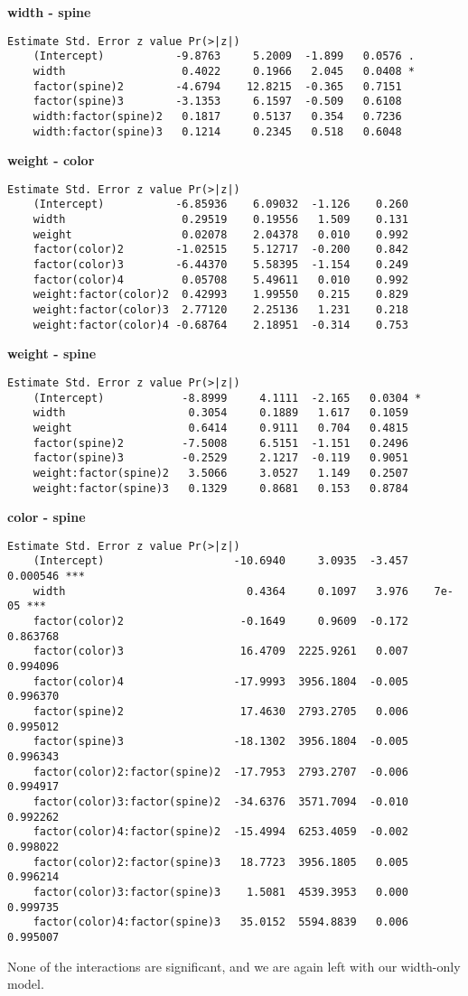 \documentclass[a4paper, twocolumn]{article}
\begin{document}
\textbf{width - spine}
\begin{Verbatim}[fontsize=\scriptsize]
    Estimate Std. Error z value Pr(>|z|)
    (Intercept)           -9.8763     5.2009  -1.899   0.0576 .
    width                  0.4022     0.1966   2.045   0.0408 *
    factor(spine)2        -4.6794    12.8215  -0.365   0.7151  
    factor(spine)3        -3.1353     6.1597  -0.509   0.6108  
    width:factor(spine)2   0.1817     0.5137   0.354   0.7236  
    width:factor(spine)3   0.1214     0.2345   0.518   0.6048    
\end{Verbatim}

\textbf{weight - color}
\begin{Verbatim}[fontsize=\scriptsize]
    Estimate Std. Error z value Pr(>|z|)
    (Intercept)           -6.85936    6.09032  -1.126    0.260
    width                  0.29519    0.19556   1.509    0.131
    weight                 0.02078    2.04378   0.010    0.992
    factor(color)2        -1.02515    5.12717  -0.200    0.842
    factor(color)3        -6.44370    5.58395  -1.154    0.249
    factor(color)4         0.05708    5.49611   0.010    0.992
    weight:factor(color)2  0.42993    1.99550   0.215    0.829
    weight:factor(color)3  2.77120    2.25136   1.231    0.218
    weight:factor(color)4 -0.68764    2.18951  -0.314    0.753    
\end{Verbatim}

\textbf{weight - spine}
\begin{Verbatim}[fontsize=\scriptsize]
    Estimate Std. Error z value Pr(>|z|)
    (Intercept)            -8.8999     4.1111  -2.165   0.0304 *
    width                   0.3054     0.1889   1.617   0.1059  
    weight                  0.6414     0.9111   0.704   0.4815  
    factor(spine)2         -7.5008     6.5151  -1.151   0.2496  
    factor(spine)3         -0.2529     2.1217  -0.119   0.9051  
    weight:factor(spine)2   3.5066     3.0527   1.149   0.2507  
    weight:factor(spine)3   0.1329     0.8681   0.153   0.8784 
\end{Verbatim}

\textbf{color - spine}
\begin{Verbatim}[fontsize=\scriptsize]
    Estimate Std. Error z value Pr(>|z|)    
    (Intercept)                    -10.6940     3.0935  -3.457 0.000546 ***
    width                            0.4364     0.1097   3.976    7e-05 ***
    factor(color)2                  -0.1649     0.9609  -0.172 0.863768    
    factor(color)3                  16.4709  2225.9261   0.007 0.994096    
    factor(color)4                 -17.9993  3956.1804  -0.005 0.996370    
    factor(spine)2                  17.4630  2793.2705   0.006 0.995012    
    factor(spine)3                 -18.1302  3956.1804  -0.005 0.996343    
    factor(color)2:factor(spine)2  -17.7953  2793.2707  -0.006 0.994917    
    factor(color)3:factor(spine)2  -34.6376  3571.7094  -0.010 0.992262    
    factor(color)4:factor(spine)2  -15.4994  6253.4059  -0.002 0.998022    
    factor(color)2:factor(spine)3   18.7723  3956.1805   0.005 0.996214    
    factor(color)3:factor(spine)3    1.5081  4539.3953   0.000 0.999735    
    factor(color)4:factor(spine)3   35.0152  5594.8839   0.006 0.995007
\end{Verbatim}

None of the interactions are significant, and we are again left with our width-only model.
\end{document}
